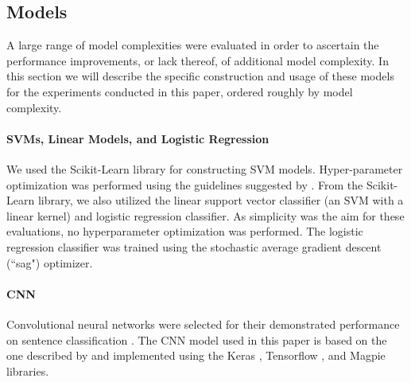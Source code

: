 \documentclass[11pt,a4paper]{article}
\theoremstyle{definition}
\begin{document}
\subsection{Models}

A large range of model complexities were evaluated in order to ascertain the performance improvements, or lack thereof, of additional model complexity. In this section we will describe the specific construction and usage of these models for the experiments conducted in this paper, ordered roughly by model complexity.

\paragraph{SVMs, Linear Models, and Logistic Regression}

We used the Scikit-Learn library \citep{pedregosaScikitlearnMachineLearning2011} for constructing SVM models. Hyper-parameter optimization was performed using the guidelines suggested by \citet{hsuPracticalGuideSupport2003}. From the Scikit-Learn library, we also utilized the linear support vector classifier (an SVM with a linear kernel) and logistic regression classifier. As simplicity was the aim for these evaluations, no hyperparameter optimization was performed. The logistic regression classifier was trained using the stochastic average gradient descent (``sag") optimizer.

\paragraph{CNN}
Convolutional neural networks were selected for their demonstrated performance on sentence classification \citep{kimConvolutionalNeuralNetworks2014}. The CNN model used in this paper is based on the one described by \citet{kimConvolutionalNeuralNetworks2014} and implemented using the Keras \citep{chollet2015keras}, Tensorflow \citep{tensorflow2015-whitepaper}, and Magpie libraries.
\end{document}
